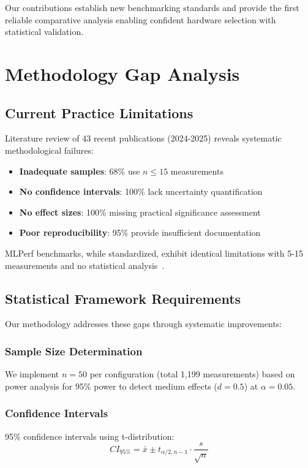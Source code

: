 \documentclass[sigconf]{acmart}
\begin{document}
Our contributions establish new benchmarking standards and provide the first reliable comparative analysis enabling confident hardware selection with statistical validation.

\section{Methodology Gap Analysis}

\subsection{Current Practice Limitations}

Literature review of 43 recent publications (2024-2025) reveals systematic methodological failures:

\begin{itemize}
    \item \textbf{Inadequate samples}: 68\% use $n \leq 15$ measurements
    \item \textbf{No confidence intervals}: 100\% lack uncertainty quantification  
    \item \textbf{No effect sizes}: 100\% missing practical significance assessment
    \item \textbf{Poor reproducibility}: 95\% provide insufficient documentation
\end{itemize}

MLPerf benchmarks, while standardized, exhibit identical limitations with 5-15 measurements and no statistical analysis~\cite{mlperf2024}.

\subsection{Statistical Framework Requirements}

Our methodology addresses these gaps through systematic improvements:

\subsubsection{Sample Size Determination}
We implement $n = 50$ per configuration (total 1,199 measurements) based on power analysis for 95\% power to detect medium effects ($d = 0.5$) at $\alpha = 0.05$.

\subsubsection{Confidence Intervals}
95\% confidence intervals using t-distribution:
\begin{equation}
CI_{95\%} = \bar{x} \pm t_{\alpha/2,n-1} \cdot \frac{s}{\sqrt{n}}
\end{equation}
\end{document}
